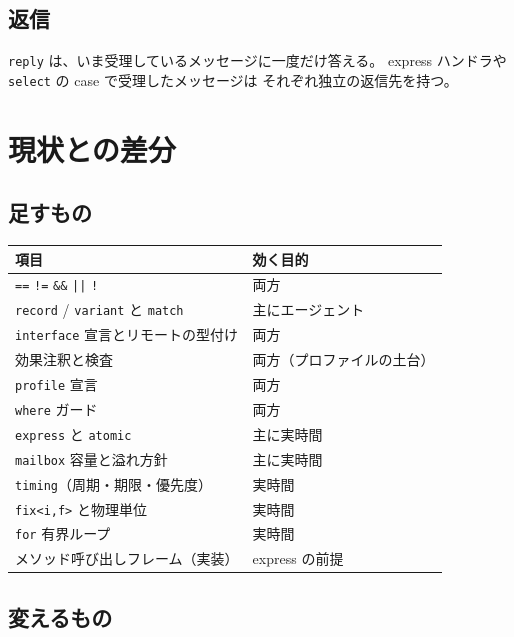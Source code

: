 \documentclass[11pt,a4paper]{ltjsarticle}
\theoremstyle{remark}
\begin{document}
\subsection{返信}

\texttt{reply} は、いま受理しているメッセージに一度だけ答える。
express ハンドラや \texttt{select} の case で受理したメッセージは
それぞれ独立の返信先を持つ。

\section{現状との差分}
\label{sec:delta}

\subsection{足すもの}

\begin{center}
\small
\begin{tabular}{@{}ll@{}}
\toprule
項目 & 効く目的 \\
\midrule
\texttt{==} \texttt{!=} \texttt{\&\&} \texttt{||} \texttt{!} & 両方 \\
\texttt{record} / \texttt{variant} と \texttt{match} & 主にエージェント \\
\texttt{interface} 宣言とリモートの型付け & 両方 \\
効果注釈と検査 & 両方（プロファイルの土台）\\
\texttt{profile} 宣言 & 両方 \\
\texttt{where} ガード & 両方 \\
\texttt{express} と \texttt{atomic} & 主に実時間 \\
\texttt{mailbox} 容量と溢れ方針 & 主に実時間 \\
\texttt{timing}（周期・期限・優先度）& 実時間 \\
\texttt{fix<i,f>} と物理単位 & 実時間 \\
\texttt{for} 有界ループ & 実時間 \\
メソッド呼び出しフレーム（実装）& express の前提 \\
\bottomrule
\end{tabular}
\end{center}

\subsection{変えるもの}
\end{document}
